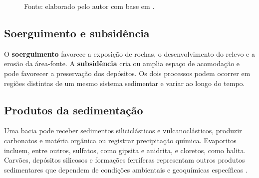 \begin{figure}[H]
  \centering
  \caption{Relação simplificada entre área-fonte, transporte, subsidência e preenchimento de uma bacia.}
  \label{fig:bacia-sedimentar}
  \caption*{\footnotesize Fonte: elaborado pelo autor com base em \textcite{nichols2009}.}
\end{figure}

\subsection{Soerguimento e subsidência}

O \textbf{soerguimento} favorece a exposição de rochas, o desenvolvimento do relevo e a erosão da área-fonte. A \textbf{subsidência} cria ou amplia espaço de acomodação e pode favorecer a preservação dos depósitos. Os dois processos podem ocorrer em regiões distintas de um mesmo sistema sedimentar e variar ao longo do tempo.

\subsection{Produtos da sedimentação}

Uma bacia pode receber sedimentos siliciclásticos e vulcanoclásticos, produzir carbonatos e matéria orgânica ou registrar precipitação química. Evaporitos incluem, entre outros, sulfatos, como gipsita e anidrita, e cloretos, como halita. Carvões, depósitos silicosos e formações ferríferas representam outros produtos sedimentares que dependem de condições ambientais e geoquímicas específicas \parencite{nichols2009}.

